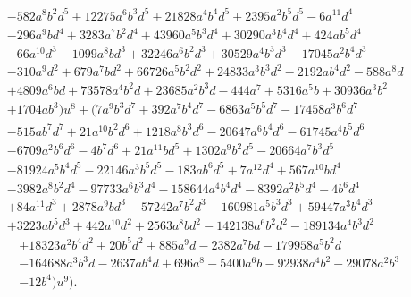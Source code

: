 \documentclass{gtpart}
\theoremstyle{definition}
\theoremstyle{remark}
\begin{document}
\begin{equation*}
\begin{split}
      & - 582 a^8 b^2 d^5 + 12275 a^6 b^3 d^5 + 21828 a^4 b^4 d^5 + 2395 a^2 b^5 d^5 - 6 a^{11} d^4 \\
      & - 296 a^9 b d^4 + 3283 a^7 b^2 d^4 + 43960 a^5 b^3 d^4 + 30290 a^3 b^4 d^4 + 424 a b^5 d^4 \\
      & - 66 a^{10} d^3 - 1099 a^8 b d^3 + 32246 a^6 b^2 d^3 + 30529 a^4 b^3 d^3 - 17045 a^2 b^4 d^3 \\
      & - 310 a^9 d^2 + 679 a^7 b d^2 + 66726 a^5 b^2 d^2 + 24833 a^3 b^3 d^2 - 2192 a b^4 d^2 - 588 a^8 d \\
      & + 4809 a^6 b d + 73578 a^4 b^2 d + 23685 a^2 b^3 d - 444 a^7 + 5316 a^5 b + 30936 a^3 b^2 \\
      & + 1704 a b^3) u^8 + (7 a^9 b^3 d^7 + 392 a^7 b^4 d^7 - 6863 a^5 b^5 d^7 - 17458 a^3 b^6 d^7 \\
      & - 515 a b^7 d^7 + 21 a^{10} b^2 d^6 + 1218 a^8 b^3 d^6 - 20647 a^6 b^4 d^6 - 61745 a^4 b^5 d^6 \\
      & - 6709 a^2 b^6 d^6 - 4 b^7 d^6 + 21 a^{11} b d^5 + 1302 a^9 b^2 d^5 - 20664 a^7 b^3 d^5 \\
      & - 81924 a^5 b^4 d^5 - 22146 a^3 b^5 d^5 - 183 a b^6 d^5 + 7 a^{12} d^4 + 567 a^{10} b d^4 \\
      & - 3982 a^8 b^2 d^4 - 97733 a^6 b^3 d^4 - 158644 a^4 b^4 d^4 - 8392 a^2 b^5 d^4 - 4 b^6 d^4 \\
      & + 84 a^{11} d^3 + 2878 a^9 b d^3 - 57242 a^7 b^2 d^3 - 160981 a^5 b^3 d^3 + 59447 a^3 b^4 d^3 \\
      & + 3223 a b^5 d^3 + 442 a^{10} d^2 + 2563 a^8 b d^2 - 142138 a^6 b^2 d^2 - 189134 a^4 b^3 d^2 
\end{split}
\end{equation*}
\begin{equation*}
\begin{split}
~~~   & + 18323 a^2 b^4 d^2 + 20 b^5 d^2 + 885 a^9 d - 2382 a^7 b d - 179958 a^5 b^2 d \\
      & - 164688 a^3 b^3 d - 2637 a b^4 d + 696 a^8 - 5400 a^6 b - 92938 a^4 b^2 - 29078 a^2 b^3 \\
      & - 12 b^4) u^9 \big).  
\end{split}
\end{equation*}


%
%
\end{document}
